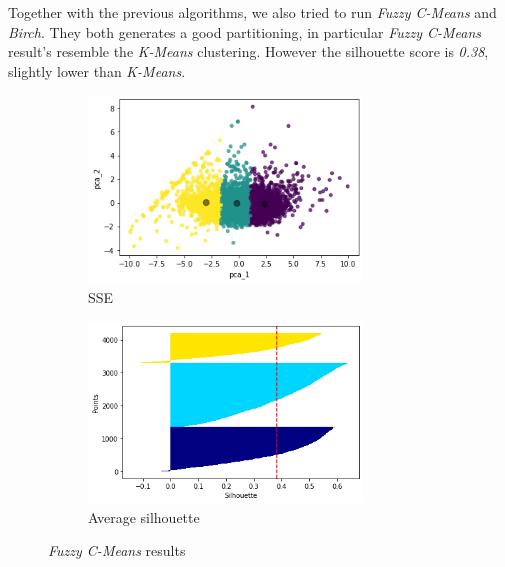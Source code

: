 Together with the previous algorithms, we also tried to run \emph{Fuzzy C-Means} and \emph{Birch}. They both generates a good partitioning, in particular \emph{Fuzzy C-Means} result's resemble the \emph{K-Means} clustering. However the silhouette score is \emph{0.38}, slightly lower than \emph{K-Means}.

\begin{figure}[h!]
     \captionsetup{justification=centering}		
     \centering
     \begin{subfigure}{0.39\textwidth}
         \centering
	 \captionsetup{type=figure}
         \includegraphics[width=0.8\textwidth]{img/clustering/clust_fcmeans.png}
         \caption{SSE}
         \label{fig:clust_fcmeans}
     \end{subfigure}
     \begin{subfigure}{0.39\textwidth}
         \centering
         \includegraphics[width=0.8\textwidth]{img/clustering/sil_fcmeans.png}
         \caption{Average silhouette}
         \label{fig:sil_fcmeans}
     \end{subfigure}
     \caption{\emph{Fuzzy C-Means} results}
    \label{fig:fc_means}
\end{figure}

